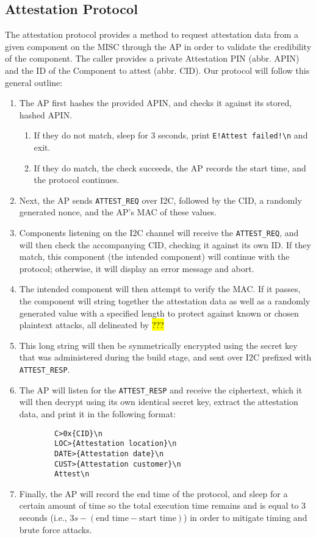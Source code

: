 \subsection{Attestation Protocol}

The attestation protocol provides a method to request attestation data from a given component on the MISC through the AP in order to validate the credibility of the component. The caller provides a private Attestation PIN (abbr. APIN) and the ID of the Component to attest (abbr. CID). Our protocol will follow this general outline:
\begin{enumerate}
    \item The AP first hashes the provided APIN, and checks it against its stored, hashed APIN.
    \begin{enumerate}
        \item If they do not match, sleep for 3 seconds, print \texttt{E!Attest failed!\textbackslash n} and exit.
        \item If they do match, the check succeeds, the AP records the start time, and the protocol continues.
    \end{enumerate}
    \item Next, the AP sends \texttt{ATTEST\_REQ} over I2C, followed by the CID, a randomly generated nonce, and the AP's MAC of these values.
    \item Components listening on the I2C channel will receive the \texttt{ATTEST\_REQ}, and will then check the accompanying CID, checking it against its own ID. If they match, this component (the intended component) will continue with the protocol; otherwise, it will display an error message and abort.
    \item The intended component will then attempt to verify the MAC. If it passes, the component will string together the attestation data as well as a randomly generated value with a specified length to protect against known or chosen plaintext attacks, all delineated by \hl{???}  
    \item This long string will then be symmetrically encrypted using the secret key that was administered during the build stage, and sent over I2C prefixed with \texttt{ATTEST\_RESP}.
    \item The AP will listen for the \texttt{ATTEST\_RESP} and receive the ciphertext, which it will then decrypt using its own identical secret key, extract the attestation data, and print it in the following format:
    \begin{verbatim}
        C>0x{CID}\n
        LOC>{Attestation location}\n
        DATE>{Attestation date}\n
        CUST>{Attestation customer}\n
        Attest\n\end{verbatim}
    \item Finally, the AP will record the end time of the protocol, and sleep for a certain amount of time so the total execution time remains and is equal to 3 seconds (i.e., $3s - (\text{end time} - \text{start time})$) in order to mitigate timing and brute force attacks.
\end{enumerate}

